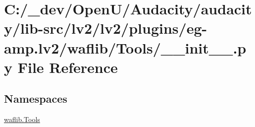 \hypertarget{lv2_2lv2_2plugins_2eg-amp_8lv2_2waflib_2_tools_2____init_____8py}{}\section{C\+:/\+\_\+dev/\+Open\+U/\+Audacity/audacity/lib-\/src/lv2/lv2/plugins/eg-\/amp.lv2/waflib/\+Tools/\+\_\+\+\_\+init\+\_\+\+\_\+.py File Reference}
\label{lv2_2lv2_2plugins_2eg-amp_8lv2_2waflib_2_tools_2____init_____8py}
\subsection*{Namespaces}
\begin{DoxyCompactItemize}
\item 
 \hyperlink{namespacewaflib_1_1_tools}{waflib.\+Tools}
\end{DoxyCompactItemize}
